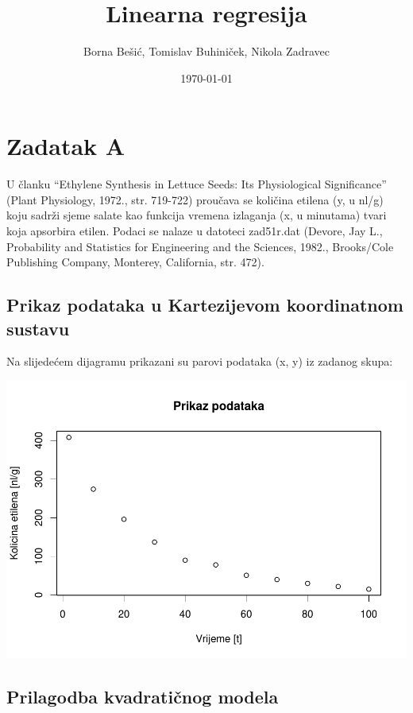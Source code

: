 \documentclass[]{article}
\title{Linearna regresija}
\author{Borna Bešić, Tomislav Buhiniček, Nikola Zadravec}
\date{\today}
\begin{document}
\maketitle

\section{Zadatak A}\label{zadatak-a}

U članku ``Ethylene Synthesis in Lettuce Seeds: Its Physiological
Significance'' (Plant Physiology, 1972., str. 719-722) proučava se
količina etilena (y, u nl/g) koju sadrži sjeme salate kao funkcija
vremena izlaganja (x, u minutama) tvari koja apsorbira etilen. Podaci se
nalaze u datoteci zad51r.dat (Devore, Jay L., Probability and Statistics
for Engineering and the Sciences, 1982., Brooks/Cole Publishing Company,
Monterey, California, str. 472).

\subsection{Prikaz podataka u Kartezijevom koordinatnom
sustavu}\label{prikaz-podataka-u-kartezijevom-koordinatnom-sustavu}

Na slijedećem dijagramu prikazani su parovi podataka (x, y) iz zadanog
skupa:

\includegraphics{Izvjestaj_files/figure-latex/unnamed-chunk-1-1.pdf}

\subsection{Prilagodba kvadratičnog
modela}\label{prilagodba-kvadraticnog-modela}
\end{document}
